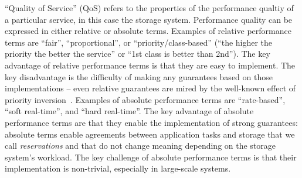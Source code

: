 



``Quality of Service'' (QoS) refers to the
properties of the performance qualtiy of a particular service, in
this case the storage system.
Performance quality can be expressed in either relative or absolute
terms. Examples of relative performance terms are ``fair'',
``proportional'', or ``priority/class-based'' (``the higher the
priority the better the service'' or ``1st class is better than
2nd''). The key advantage of relative performance terms is that
they are easy to implement. The key disadvantage is the difficulty
of making any guarantees based on those implementations --
even relative guarantees are mired by the well-known effect of
priority inversion~\cite{lampson:cacm80}. Examples of absolute
performance terms are ``rate-based'', ``soft real-time'', and
``hard real-time''. The key advantage of absolute performance
terms are that they enable the implementation of strong
guarantees: absolute terms enable agreements between application
tasks and storage that we call \emph{reservations} and that do not
change meaning depending
on the storage system's workload. The key challenge of absolute
performance terms is that their implementation is non-trivial,
especially in large-scale systems.

